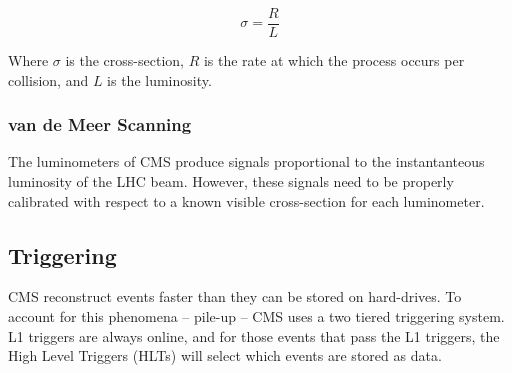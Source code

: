 \begin{equation}
\sigma  = \frac{R}{\mathit{L}}
\end{equation}

Where $\sigma$ is the cross-section, $R$ is the rate at which the process occurs per collision, and $L$ is the luminosity.  

\subsubsection{van de Meer Scanning}

The luminometers of CMS produce signals proportional to the instantanteous luminosity of the LHC beam. However, these signals need to be properly calibrated with respect to a known visible cross-section for each luminometer. 

\subsection{Triggering}

CMS reconstruct events faster than they can be stored on hard-drives. To account for this phenomena -- pile-up -- CMS uses a two tiered triggering system. L1 triggers are always online, and for those events that pass the L1 triggers, the High Level Triggers (HLTs) will select which events are stored as data.